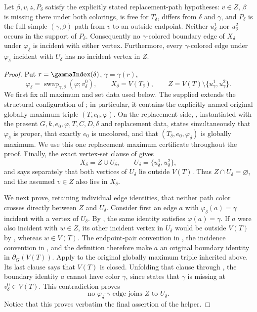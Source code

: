 \begin{helper}
Let $\beta,v,z,P_\delta$ satisfy the explicitly stated replacement-path
hypotheses: $v\in Z$, $\beta$ is missing there under both colorings, is
free for $T_\delta$, differs from $\delta$ and $\gamma$, and
$P_\delta$ is the full simple $(\gamma,\beta)$ path from $v$ to an
outside endpoint.  Neither $u^1_\delta$ nor $u^2_\delta$ occurs in the
support of $P_\delta$.  Consequently no $\gamma$-colored boundary edge
of $X_\delta$ under $\varphi_\delta$ is incident with either vertex.
Furthermore, every $\gamma$-colored edge under $\varphi_\delta$ incident
with $U_\delta$ has no incident vertex in $Z$.
\end{helper}
\begin{proof}
Put $r=\gammaIndex(\delta)$, $\gamma=\gamma(r)$,
\[
 \varphi_\delta=
 \operatorname{swap}_{\gamma,\delta}(\varphi;v^0_\delta),
 \qquad X_\delta=V(T_\delta),
 \qquad Z=V(T)\setminus
   \{u^1_\gamma,u^2_\gamma\}.
\]
We first fix all maximum and set data used below.  The supplied
 extends the structural configuration
of ; in particular, it contains
the explicitly named original globally maximum triple
$(T,e_0,\varphi)$.  On the replacement side,
, instantiated with the present
$G,k,e_0,\varphi,T,C,D,\delta$ and replacement data, states simultaneously
that $\varphi_\delta$ is proper, that exactly $e_0$ is uncolored, and that
$(T_\delta,e_0,\varphi_\delta)$ is globally maximum.  We use this one
replacement maximum certificate throughout the proof.  Finally, the exact
vertex-set clause of  gives
\[
                     X_\delta=Z\cup U_\delta,
 \qquad U_\delta=\{u^1_\delta,u^2_\delta\},                 \tag{1}
\]
and says separately that both vertices of $U_\delta$ lie outside $V(T)$.
Thus $Z\cap U_\delta=\varnothing$, and the assumed $v\in Z$ also lies in
$X_\delta$.

We next prove, retaining individual edge identities, that neither path
color crosses directly between $Z$ and $U_\delta$.  Consider first an
edge $a$ with $\varphi_\delta(a)=\gamma$ incident with a vertex of
$U_\delta$.  By , the same identity
satisfies $\varphi(a)=\gamma$.  If $a$ were also incident with
$w\in Z$, its other incident vertex in $U_\delta$ would be outside
$V(T)$ by , whereas $w\in V(T)$.
The endpoint-pair convention in , the
incidence convention in , and the definition
 therefore make $a$ an original boundary identity
in $\partial_G(V(T))$.  Apply  to the
original globally maximum triple inherited above.  Its last clause says
that $V(T)$ is closed.  Unfolding that clause through
, the boundary identity $a$ cannot have
color $\gamma$, since  states that
$\gamma$ is missing at $v^0_\delta\in V(T)$.  This contradiction proves
\[
 \text{no $\varphi_\delta$-$\gamma$ edge joins $Z$ to $U_\delta$.} \tag{2}
\]
Notice that this proves verbatim the final assertion of the helper.


\end{proof}
